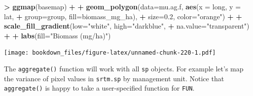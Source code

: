 \documentclass[]{krantz}
\makeatletter
\newenvironment{Shaded}{\begin{snugshade}}{\end{snugshade}}
\newcommand{\KeywordTok}[1]{\textcolor[rgb]{0.27,0.27,0.27}{\textbf{#1}}}
\newcommand{\DataTypeTok}[1]{\textcolor[rgb]{0.27,0.27,0.27}{#1}}
\newcommand{\FloatTok}[1]{\textcolor[rgb]{0.06,0.06,0.06}{#1}}
\newcommand{\StringTok}[1]{\textcolor[rgb]{0.5,0.5,0.5}{#1}}
\newcommand{\ControlFlowTok}[1]{\textcolor[rgb]{0.27,0.27,0.27}{\textbf{#1}}}
\newcommand{\OperatorTok}[1]{\textcolor[rgb]{0.43,0.43,0.43}{\textbf{#1}}}
\newcommand{\ErrorTok}[1]{\textcolor[rgb]{0.14,0.14,0.14}{\textbf{#1}}}
\newcommand{\NormalTok}[1]{#1}
\newenvironment{kframe}{%
\medskip{}
\setlength{\fboxsep}{.8em}
 \def\at@end@of@kframe{}%
 \ifinner\ifhmode%
  \def\at@end@of@kframe{\end{minipage}}%
  \begin{minipage}{\columnwidth}%
 \fi\fi%
 \def\FrameCommand##1{\hskip\@totalleftmargin \hskip-\fboxsep
 \colorbox{shadecolor}{##1}\hskip-\fboxsep
     \hskip-\linewidth \hskip-\@totalleftmargin \hskip\columnwidth}%
 \MakeFramed {\advance\hsize-\width
   \@totalleftmargin\z@ \linewidth\hsize
   \@setminipage}}%
 {\par\unskip\endMakeFramed%
 \at@end@of@kframe}
\renewenvironment{Shaded}{\begin{kframe}}{\end{kframe}}
\makeatother
\begin{document}
\begin{Shaded}
\begin{Highlighting}[]
\OperatorTok{>}\StringTok{ }\KeywordTok{ggmap}\NormalTok{(basemap) }\OperatorTok{+}
\OperatorTok{+}\StringTok{     }\KeywordTok{geom_polygon}\NormalTok{(}\DataTypeTok{data=}\NormalTok{mu.ag.f, }\KeywordTok{aes}\NormalTok{(}\DataTypeTok{x =}\NormalTok{ long, }\DataTypeTok{y =}\NormalTok{ lat, }
\OperatorTok{+}\StringTok{                                 }\DataTypeTok{group=}\NormalTok{group, }\DataTypeTok{fill=}\NormalTok{biomass_mg_ha), }
\OperatorTok{+}\StringTok{                  }\DataTypeTok{size=}\FloatTok{0.2}\NormalTok{, }\DataTypeTok{color=}\StringTok{"orange"}\NormalTok{) }\OperatorTok{+}
\OperatorTok{+}\StringTok{     }\KeywordTok{scale_fill_gradient}\NormalTok{(}\DataTypeTok{low=}\StringTok{"white"}\NormalTok{, }\DataTypeTok{high=}\StringTok{"darkblue"}\NormalTok{, }
\OperatorTok{+}\StringTok{                         }\DataTypeTok{na.value=}\StringTok{"transparent"}\NormalTok{) }\OperatorTok{+}
\OperatorTok{+}\StringTok{     }\KeywordTok{labs}\NormalTok{(}\DataTypeTok{fill=}\StringTok{"Biomass (mg/ha)"}\NormalTok{)}
\end{Highlighting}
\end{Shaded}

\texttt{[image: bookdown\_files/figure-latex/unnamed-chunk-220-1.pdf]}

The \texttt{aggregate()} function will work with all \texttt{sp}
objects. For example let's map the variance of pixel values in
\texttt{srtm.sp} by management unit. Notice that \texttt{aggregate()} is
happy to take a user-specified function for \texttt{FUN}.

\begin{Shaded}
\end{Shaded}
\end{document}
